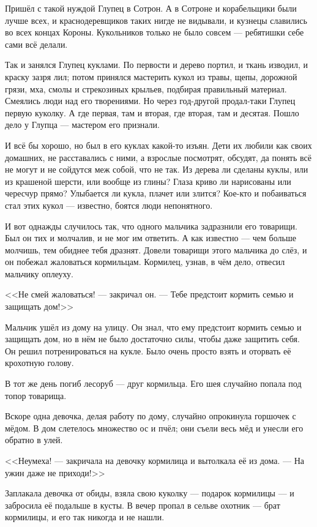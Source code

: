 Пришёл с такой нуждой Глупец в Сотрон.
А в Сотроне и корабельщики были лучше всех, и краснодеревщиков таких нигде не видывали, и кузнецы славились во всех концах Короны.
Кукольников только не было совсем --- ребятишки себе сами всё делали.

Так и занялся Глупец куклами.
По первости и дерево портил, и ткань изводил, и краску зазря лил;
потом принялся мастерить кукол из травы, щепы, дорожной грязи, мха, смолы и стрекозиных крыльев, подбирая правильный материал.
Смеялись люди над его творениями.
Но через год-другой продал-таки Глупец первую куколку.
А где первая, там и вторая, где вторая, там и десятая.
Пошло дело у Глупца --- мастером его признали.

И всё бы хорошо, но был в его куклах какой-то изъян.
Дети их любили как своих домашних, не расставались с ними, а взрослые посмотрят, обсудят, да понять всё не могут и не сойдутся меж собой, что не так.
Из дерева ли сделаны куклы, или из крашеной шерсти, или вообще из глины?
Глаза криво ли нарисованы или чересчур прямо?
Улыбается ли кукла, плачет или злится?
Кое-кто и побаиваться стал этих кукол --- известно, боятся люди непонятного.

И вот однажды случилось так, что одного мальчика задразнили его товарищи.
Был он тих и молчалив, и не мог им ответить.
А как известно --- чем больше молчишь, тем обиднее тебя дразнят.
Довели товарищи этого мальчика до слёз, и он побежал жаловаться кормильцам.
Кормилец, узнав, в чём дело, отвесил мальчику оплеуху.

<<Не смей жаловаться! --- закричал он.
--- Тебе предстоит кормить семью и защищать дом!>>

Мальчик ушёл из дому на улицу.
Он знал, что ему предстоит кормить семью и защищать дом, но в нём не было достаточно силы, чтобы даже защитить себя.
Он решил потренироваться на кукле.
Было очень просто взять и оторвать её крохотную голову.

В тот же день погиб лесоруб --- друг кормильца.
Его шея случайно попала под топор товарища.

Вскоре одна девочка, делая работу по дому, случайно опрокинула горшочек с мёдом.
В дом слетелось множество ос и пчёл; они съели весь мёд и унесли его обратно в улей.

<<Неумеха! --- закричала на девочку кормилица и вытолкала её из дома.
--- На ужин даже не приходи!>>

Заплакала девочка от обиды, взяла свою куколку --- подарок кормилицы --- и забросила её подальше в кусты.
В вечер пропал в сельве охотник --- брат кормилицы, и его так никогда и не нашли.

